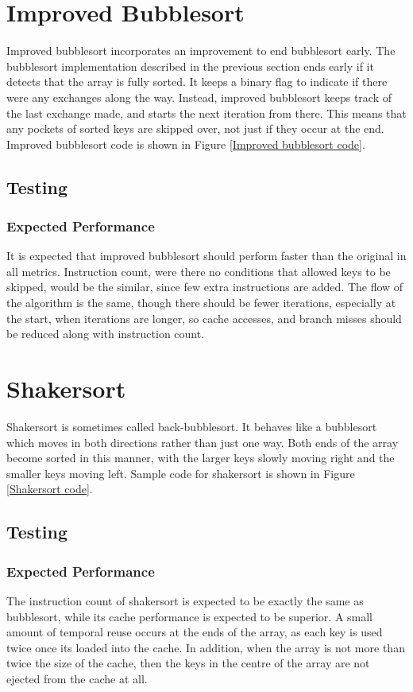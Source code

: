 \section{Improved Bubblesort}
Improved bubblesort incorporates an improvement to end bubblesort early. The
bubblesort implementation described in the previous section ends early if it
detects that the array is fully sorted. It keeps a binary flag to indicate if
there were any exchanges along the way. Instead, improved bubblesort keeps track
of the last exchange made, and starts the next iteration from there. This means
that any pockets of sorted keys are skipped over, not just if they occur at the
end. Improved bubblesort code is shown in Figure \vref{Improved bubblesort
code}.

\subsection{Testing}
\subsubsection{Expected Performance}
It is expected that improved bubblesort should perform faster than the original
in all metrics. Instruction count, were there no conditions that allowed keys to
be skipped, would be the similar, since few extra instructions are added. The
flow of the algorithm is the same, though there should be fewer iterations,
especially at the start, when iterations are longer, so cache accesses, and
branch misses should be reduced along with instruction count.

\section{Shakersort}
Shakersort is sometimes called back-bubblesort. It behaves like a bubblesort
which moves in both directions rather than just one way. Both ends of the array
become sorted in this manner, with the larger keys slowly moving right and the
smaller keys moving left. Sample code for shakersort is shown in Figure
\vref{Shakersort code}.

\subsection{Testing}
\subsubsection{Expected Performance}
The instruction count of shakersort is expected to be exactly the same as
bubblesort, while its cache performance is expected to be superior. A small
amount of temporal reuse occurs at the ends of the array, as each key is used
twice once its loaded into the cache. In addition, when the array is not more
than twice the size of the cache, then the keys in the centre of the array are
not ejected from the cache at all.

